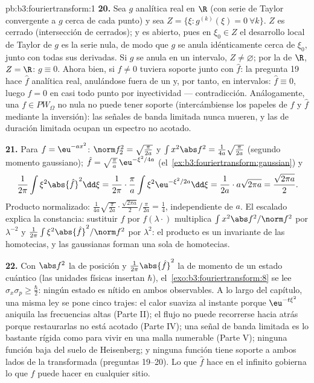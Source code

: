\begin{solution}{pb:b3:fouriertransform:1}
\textbf{20.} Sea $g$ analítica real en $\R$ (con serie de Taylor
convergente a $g$ cerca de cada punto) y sea $Z = \{\xi :
g^{(k)}(\xi) = 0\ \forall k\}$. $Z$ es cerrado (intersección de
cerrados); y es abierto, pues en $\xi_0 \in Z$ el desarrollo local de
Taylor de $g$ es la serie nula, de modo que $g$ se anula idénticamente
cerca de $\xi_0$, junto con todas sus derivadas. Si $g$ se anula en un
intervalo, $Z \neq \varnothing$; por la
 de $\R$, $Z = \R$:
$g \equiv 0$. Ahora bien, si $f
\neq 0$ tuviera soporte  junto
con $\hat f$: la pregunta 19 hace $\hat f$ analítica real, anulándose
fuera de un  y, por tanto, en
intervalos: $\hat f \equiv 0$, luego $f = 0$ en casi todo punto por
inyectividad --- contradicción. Análogamente, una $f \in
PW_\Omega$ no nula no puede tener soporte  (intercámbiense los
papeles de $f$ y $\hat f$ mediante la inversión): las señales de banda
limitada nunca mueren, y las de duración limitada ocupan un espectro no
acotado.

\textbf{21.} Para $f = \eu^{-ax^2}$: $\norm f_2^2 =
\sqrt{\frac\pi{2a}}$ y $\int x^2\abs f^2 =
\frac1{4a}\sqrt{\frac{\pi}{2a}}$ (segundo momento gaussiano);
$\hat f = \sqrt{\frac\pi a}\,\eu^{-\xi^2/4a}$
(el~\cref{ex:b3:fouriertransform:gaussian}) y
\[
\frac1{2\pi}\int\xi^2\abs{\hat f}^2\dd\xi =
\frac1{2\pi}\cdot\frac\pi a\int\xi^2
\eu^{-\xi^2/2a}\dd\xi = \frac1{2a}\cdot a\sqrt{2\pi a}
= \frac{\sqrt{2\pi a}}2 .
\]
Producto normalizado: $\frac1{4a}\sqrt{\frac\pi{2a}}\cdot
\frac{\sqrt{2\pi a}}2\big/\frac{\pi}{2a} = \frac14$, independiente de
$a$. El escalado explica la constancia: sustituir $f$ por
$f(\lambda\cdot)$ multiplica $\int x^2\abs f^2/\norm
f^2$ por $\lambda^{-2}$ y $\frac1{2\pi}\int\xi^2\abs{\hat
f}^2/\norm f^2$ por $\lambda^{2}$: el producto es un invariante de las
homotecias, y las gaussianas forman una sola
 de homotecias.

\textbf{22.} Con $\abs f^2$ la 
de posición y $\frac1{2\pi}\abs{\hat f}^2$ la
 de momento de un estado cuántico
(las unidades físicas insertan $\hbar$),
el~\cref{exo:b3:fouriertransform:8} se lee $\sigma_x\sigma_p
\geq \frac\hbar2$: ningún estado es nítido en ambos observables. A lo
largo del capítulo, una misma ley se pone cinco trajes: el calor suaviza
al instante porque $\eu^{-t\xi^2}$ aniquila las frecuencias altas (Parte
II); el flujo no puede recorrerse hacia atrás porque restaurarlas no
está acotado (Parte IV); una señal de banda limitada es lo bastante
rígida como para vivir en una malla numerable (Parte V); ninguna función
baja del suelo de Heisenberg; y ninguna función tiene soporte  a
ambos lados de la transformada (preguntas 19--20). Lo que $\hat f$ hace
en el infinito gobierna lo que $f$ puede hacer en cualquier sitio.


\end{solution}
